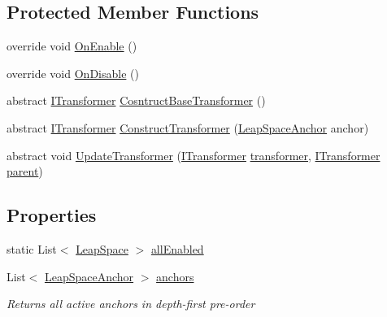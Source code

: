 \subsection*{Protected Member Functions}
\begin{DoxyCompactItemize}
\item 
override void \mbox{\hyperlink{class_leap_1_1_unity_1_1_space_1_1_leap_space_ad15999d46ce8be0203f2a5b67ced8a8e}{On\+Enable}} ()
\item 
override void \mbox{\hyperlink{class_leap_1_1_unity_1_1_space_1_1_leap_space_abc3c50579682cc467e55f2f857f18321}{On\+Disable}} ()
\item 
abstract \mbox{\hyperlink{interface_leap_1_1_unity_1_1_space_1_1_i_transformer}{I\+Transformer}} \mbox{\hyperlink{class_leap_1_1_unity_1_1_space_1_1_leap_space_a344e65e7be98cd41ba6c6804b283f681}{Cosntruct\+Base\+Transformer}} ()
\item 
abstract \mbox{\hyperlink{interface_leap_1_1_unity_1_1_space_1_1_i_transformer}{I\+Transformer}} \mbox{\hyperlink{class_leap_1_1_unity_1_1_space_1_1_leap_space_af6ff18ae47b473989e65d321da089948}{Construct\+Transformer}} (\mbox{\hyperlink{class_leap_1_1_unity_1_1_space_1_1_leap_space_anchor}{Leap\+Space\+Anchor}} anchor)
\item 
abstract void \mbox{\hyperlink{class_leap_1_1_unity_1_1_space_1_1_leap_space_a37ecec9c078832e89a9b71b8455df62f}{Update\+Transformer}} (\mbox{\hyperlink{interface_leap_1_1_unity_1_1_space_1_1_i_transformer}{I\+Transformer}} \mbox{\hyperlink{class_leap_1_1_unity_1_1_space_1_1_leap_space_anchor_a6f98d35d75f83e2ff2c978715520c836}{transformer}}, \mbox{\hyperlink{interface_leap_1_1_unity_1_1_space_1_1_i_transformer}{I\+Transformer}} \mbox{\hyperlink{class_leap_1_1_unity_1_1_space_1_1_leap_space_anchor_a8df76f5c9ba6a0f169880fec6bca557b}{parent}})
\end{DoxyCompactItemize}
\subsection*{Properties}
\begin{DoxyCompactItemize}
\item 
static List$<$ \mbox{\hyperlink{class_leap_1_1_unity_1_1_space_1_1_leap_space}{Leap\+Space}} $>$ \mbox{\hyperlink{class_leap_1_1_unity_1_1_space_1_1_leap_space_abb31d6bf34c02c7b40fe0e34efad87cb}{all\+Enabled}}
\item 
List$<$ \mbox{\hyperlink{class_leap_1_1_unity_1_1_space_1_1_leap_space_anchor}{Leap\+Space\+Anchor}} $>$ \mbox{\hyperlink{class_leap_1_1_unity_1_1_space_1_1_leap_space_a2fe263fdf2f99d707d36c8797cf9f4e4}{anchors}}
\begin{DoxyCompactList}\small\item\em Returns all active anchors in depth-\/first pre-\/order \end{DoxyCompactList}\end{DoxyCompactItemize}
